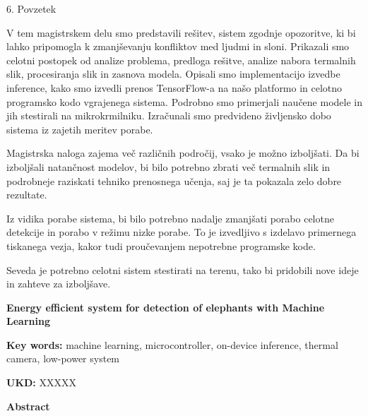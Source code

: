 {6. Povzetek

V tem magistrskem delu smo predstavili rešitev, sistem zgodnje opozoritve, ki bi lahko pripomogla k zmanjševanju konfliktov med ljudmi in sloni.
Prikazali smo celotni postopek od analize problema, predloga rešitve, analize nabora termalnih slik, procesiranja slik in zasnova modela.
Opisali smo implementacijo izvedbe inference, kako smo izvedli prenos TensorFlow-a na našo platformo in celotno programsko kodo vgrajenega sistema.
Podrobno smo primerjali naučene modele in jih stestirali na mikrokrmilniku.
Izračunali smo predvideno življensko dobo sistema iz zajetih meritev porabe.

Magistrska naloga zajema več različnih področij, vsako je možno izboljšati.
Da bi izboljšali natančnost modelov, bi bilo potrebno zbrati več termalnih slik in podrobneje raziskati tehniko prenosnega učenja, saj je ta pokazala zelo dobre rezultate.

Iz vidika porabe sistema, bi bilo potrebno nadalje zmanjšati porabo celotne detekcije in porabo v režimu nizke porabe.
To je izvedljivo s izdelavo primernega tiskanega vezja, kakor tudi proučevanjem nepotrebne programske kode.

Seveda je potrebno celotni sistem stestirati na terenu, tako bi pridobili nove ideje in zahteve za izboljšave.
}
\newpage

\begin{poglavje}
\noindent\bfseries Energy efficient system for detection of elephants with Machine Learning
\end{poglavje}

\bigskip
\bigskip
\bigskip
\bigskip
\bigskip
\textbf{Key words:} machine learning, microcontroller, on-device inference, thermal camera, low-power system

\bigskip
\textbf{UKD:} XXXXX

\bigskip
\textbf{Abstract}

